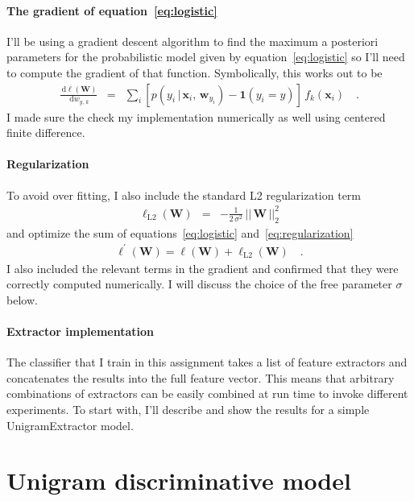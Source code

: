 \documentclass[11pt]{article}
\newcommand{\bvec}[1]{\ensuremath{\boldsymbol{#1}}}
\newcommand{\dd}{\ensuremath{\, \mathrm{d}}}
\newcommand{\code}[1]{{\sffamily #1}}
\begin{document}
\paragraph{The gradient of equation~\ref{eq:logistic}}
I'll be using a gradient descent algorithm to find the maximum a posteriori
parameters for the probabilistic model given by equation~\ref{eq:logistic} so
I'll need to compute the gradient of that function.
Symbolically, this works out to be
\begin{eqnarray}
\frac{\dd \ell(\bvec{W})}{\dd w_{y,\,k}} &=&
\sum_{i}\left[p(y_i\,|\,\bvec{x}_i,\,\bvec{w}_{y_i})
- \bvec{1}(y_i = y) \right]\,f_k(\bvec{x}_i) \quad.
\end{eqnarray}
I made sure the check my implementation numerically as well using centered
finite difference.

\paragraph{Regularization}
To avoid over fitting, I also include the standard L2 regularization term
\begin{eqnarray}
\label{eq:regularization}
\ell_\mathrm{L2} (\bvec{W}) &=&
-\frac{1}{2\,\sigma^2}\,||\,\bvec{W}\,||_2^2
\end{eqnarray}
and optimize the sum of equations~\ref{eq:logistic}
and~\ref{eq:regularization}
\begin{eqnarray}
\label{eq:fullmodel}
\ell^\prime (\bvec{W}) = \ell (\bvec{W}) + \ell_\mathrm{L2} (\bvec{W}) \quad.
\end{eqnarray}
I also included the relevant terms in the gradient and confirmed that they
were correctly computed numerically.
I will discuss the choice of the free parameter $\sigma$ below.

\paragraph{Extractor implementation}
The classifier that I train in this assignment takes a list of feature
extractors and concatenates the results into the full feature vector.
This means that arbitrary combinations of extractors can be easily combined at
run time to invoke different experiments.
To start with, I'll describe and show the results for a simple
\code{UnigramExtractor} model.

\section{Unigram discriminative model}
\end{document}
